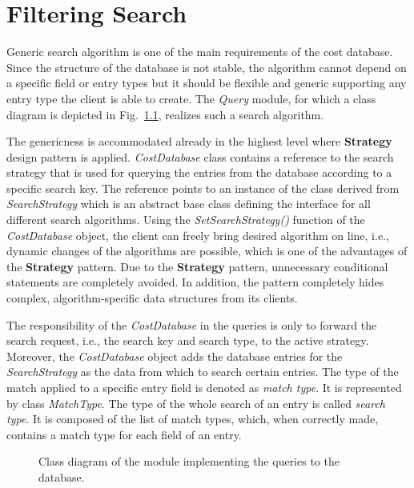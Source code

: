 \documentclass[a4paper,twoside]{tce}
\begin{document}
\chapter{Filtering Search}
\label{cha:search_algo}

Generic search algorithm is one of the main requirements of the cost
database. Since the structure of the database is not stable, the
algorithm cannot depend on a specific field or entry types but it
should be flexible and generic supporting any entry type the client is
able to create. The \emph{Query} module, for which a class diagram is
depicted in Fig.~\ref{fig:class_query}, realizes such a search
algorithm.

The genericness is accommodated already in the highest level where
\textbf{Strategy} design pattern is applied. \emph{CostDatabase}
class contains a reference to the search strategy that is used for
querying the entries from the database according to a specific
search key. The reference points to an instance of the class derived from
\emph{SearchStrategy} which is an abstract base class defining
the interface for all different search algorithms. Using the
\emph{SetSearchStrategy()} function of the \emph{CostDatabase}
object, the client can freely bring desired algorithm on line, i.e.,
dynamic changes of the algorithms are possible, which is one of the
advantages of the \textbf{Strategy} pattern. Due to the
\textbf{Strategy} pattern, unnecessary conditional statements are
completely avoided. In addition, the pattern completely hides
complex, algorithm-specific data structures from its
clients. \cite{DesignPatterns}

The responsibility of the \emph{CostDatabase} in the queries is only
to forward the search request, i.e., the search key and search type,
to the active strategy. Moreover, the \emph{CostDatabase} object adds
the database entries for the \emph{SearchStrategy} as the data from
which to search certain entries. The type of the match applied to a
specific entry field is denoted as \emph{match type}. It is
represented by class \emph{MatchType}. The type of the whole search
of an entry is called \emph{search type}. It is composed of the list
of match types, which, when correctly made, contains a match type for
each field of an entry.

\begin{figure}[tb]
\centerline{}
\caption{Class diagram of the module implementing the queries to the database.}
\label{fig:class_query}
\end{figure}
\end{document}
